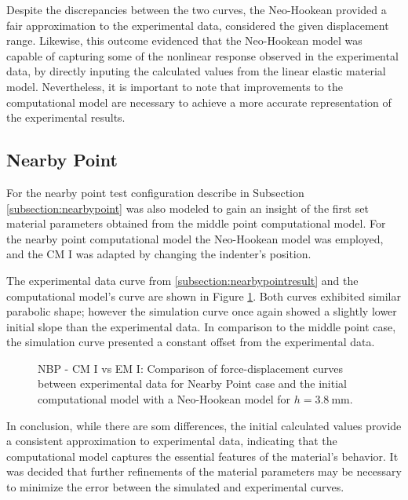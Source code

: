 Despite the discrepancies between the two curves, the Neo-Hookean provided a fair approximation to the experimental data, considered the 
given displacement range. Likewise, this outcome evidenced that the Neo-Hookean model was capable of capturing some of the nonlinear 
response observed in the experimental data, by directly inputing the calculated values from the linear elastic material model.
Nevertheless, it is important to note that improvements to the computational model are necessary to achieve a more
accurate representation of the experimental results.

\subsection{Nearby Point}
For the nearby point test configuration describe in Subsection \ref{subsection:nearbypoint} was also modeled to gain an insight 
of the first set material parameters obtained from the middle point computational model.
For the nearby point computational model the Neo-Hookean model was employed, and the CM I was adapted by changing the 
indenter's position.

The experimental data curve from \ref{subsection:nearbypointresult} and the computational model's curve are shown in Figure 
\ref{fig:nbpointIvsCPINBNH}. Both curves exhibited similar parabolic shape; however the simulation curve once again showed
a slightly lower initial slope than the experimental data. In comparison to the middle point case, the simulation curve 
presented a constant offset from the experimental data. 
\label{subsection:nbpcpI}
\begin{figure}%
    \centering
   \quad
   \caption[Nearby Point: Computational model I vs Experimental data - Neo-Hookean]{NBP - CM I vs EM I: Comparison of force-displacement curves between experimental data for Nearby Point case and the initial computational model with a Neo-Hookean model for $h = \SI{3.8}{\milli \meter}$.}%
   \label{fig:nbpointIvsCPINBNH}%
\end{figure}
In conclusion, while there are som differences, the initial calculated values provide a consistent approximation to experimental
data, indicating that the computational model captures the essential features of the material's behavior.
It was decided that further refinements of the material parameters may be necessary to minimize the error between the 
simulated and experimental curves.

